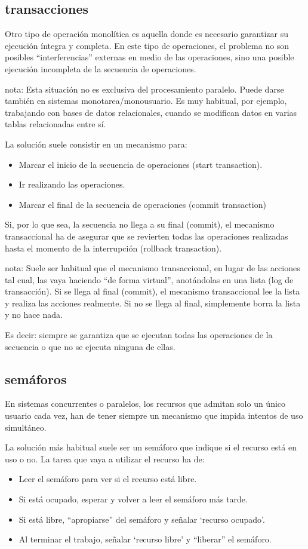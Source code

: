 \documentclass[spanish,12pt,a4paper,final,oneside]{book}
\begin{document}
\subsection{transacciones}
Otro tipo de operación monolítica es aquella donde es necesario garantizar su ejecución íntegra y completa. En este tipo de operaciones, el problema no son posibles ``interferencias'' externas en medio de las operaciones, sino una posible ejecución incompleta de la secuencia de operaciones.

nota: Esta situación no es exclusiva del procesamiento paralelo. Puede darse también en sistemas monotarea/monousuario. Es muy habitual, por ejemplo, trabajando con bases de datos relacionales, cuando se modifican datos en varias tablas relacionadas entre sí.

La solución suele consistir en un mecanismo para:
\begin{itemize}
\item Marcar el inicio de la secuencia de operaciones (start transaction).
\item Ir realizando las operaciones.
\item Marcar el final de la secuencia de operaciones (commit transaction)
\end{itemize}

Si, por lo que sea, la secuencia no llega a su final (commit), el mecanismo transaccional ha de asegurar que se revierten todas las operaciones realizadas hasta el momento de la interrupción (rollback transaction).

nota: Suele ser habitual que el mecanismo transaccional, en lugar de las acciones tal cual, las vaya haciendo ``de forma virtual'', anotándolas en una lista (log de transacción). Si se llega al final (commit), el mecanismo transaccional lee la lista y realiza las acciones realmente. Si no se llega al final, simplemente borra la lista y no hace nada. 

Es decir: siempre se garantiza que se ejecutan todas las operaciones de la secuencia o que no se ejecuta ninguna de ellas.

\subsection{semáforos}
En sistemas concurrentes o paralelos, los recursos que admitan solo un único usuario cada vez, han de tener siempre un mecanismo que impida intentos de uso simultáneo.

La solución más habitual suele ser un semáforo  que indique si el recurso está en uso o no. La tarea que vaya a utilizar el recurso ha de:
\begin{itemize}
\item Leer el semáforo para ver si el recurso está libre.
\item Si está ocupado, esperar y volver a leer el semáforo más tarde.
\item Si está libre, ``apropiarse'' del semáforo y señalar `recurso ocupado'.
\item Al terminar el trabajo, señalar `recurso libre' y ``liberar'' el semáforo.
\end{itemize}
\end{document}
